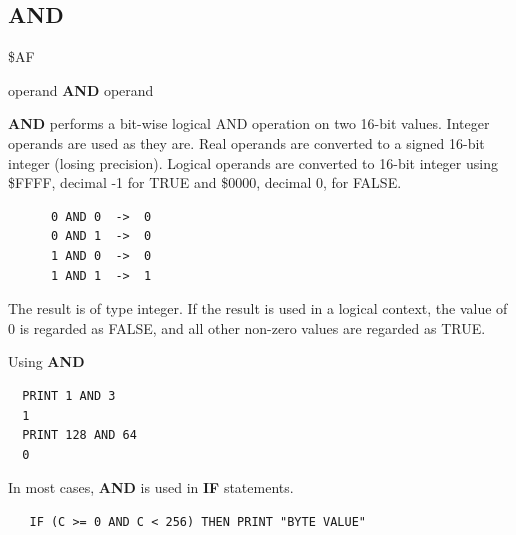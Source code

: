\subsection{AND}
\begin{description}[leftmargin=2cm,style=nextline]
\item [Token:] \$AF
\item [Format:] operand {\bf AND} operand
\item [Usage:]  {\bf AND} performs a bit-wise
                logical AND operation on two 16-bit values.
                Integer operands are used as they are.
                Real operands are converted to a signed 16-bit integer (losing precision).
                Logical operands are converted to 16-bit integer
                using \$FFFF, decimal -1 for TRUE
                and \$0000, decimal 0, for FALSE.

   \begin{verbatim}
      0 AND 0  ->  0
      0 AND 1  ->  0
      1 AND 0  ->  0
      1 AND 1  ->  1
   \end{verbatim}

\item [Remarks:] The result is of type integer.
                 If the result is used in a logical context,
                 the value of 0 is regarded as FALSE, and
                 all other non-zero values are regarded as TRUE.
\item [Examples:] Using {\bf AND}

\begin{tcolorbox}[colback=black,coltext=white]
\verbatimfont{\codefont}
\begin{verbatim}
  PRINT 1 AND 3
  1
  PRINT 128 AND 64
  0
\end{verbatim}
\end{tcolorbox}

In most cases, {\bf AND} is used in {\bf IF} statements.

\begin{tcolorbox}[colback=black,coltext=white]
\verbatimfont{\codefont}
\begin{verbatim}
   IF (C >= 0 AND C < 256) THEN PRINT "BYTE VALUE"
\end{verbatim}
\end{tcolorbox}
\end{description}


\newpage
